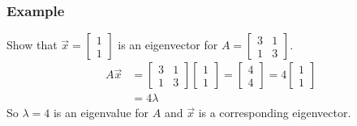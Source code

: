 \documentclass{math}
\begin{document}
\subsubsection*{Example}
Show that \( \vec{x} = \begin{bmatrix}1 \\ 1\end{bmatrix} \) is an
eigenvector for \( A = \begin{bmatrix}3 & 1 \\ 1 & 3\end{bmatrix} \).
\begin{align*}
  A\vec{x} &= \begin{bmatrix}
    3 & 1 \\
    1 & 3
  \end{bmatrix}\begin{bmatrix}1 \\ 1\end{bmatrix}
    = \begin{bmatrix}4 \\ 4\end{bmatrix}
    = 4\begin{bmatrix}1 \\ 1\end{bmatrix} \\
  &= 4\lambda
\end{align*}
So \( \lambda = 4 \) is an eigenvalue for \( A \) and \( \vec{x} \) is a
corresponding eigenvector.
\end{document}
